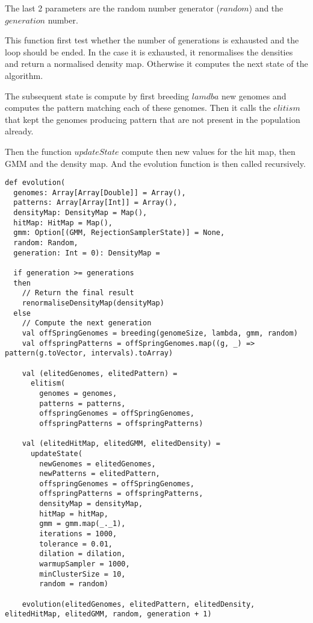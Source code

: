 \documentclass[10pt,a4paper]{article}
\theoremstyle{definition}
\theoremstyle{remark}
\begin{document}
The last 2 parameters are the random number generator ($random$) and the $generation$ number.

This function first test whether the number of generations is exhausted and the loop should be ended. In the case it is exhausted, it renormalises the densities and return a normalised density map. Otherwise it computes the next state of the algorithm.

The subsequent state is compute by first breeding $lamdba$ new genomes and computes the pattern matching each of these genomes. Then it calls the $elitism$ that kept the genomes producing pattern that are not present in the population already.

Then the function $updateState$ compute then new values for the hit map, then GMM and the density map. And the evolution function is then called recursively.

\begin{lstlisting}[caption={Evolution Loop},label={lst:loop}]
def evolution(
  genomes: Array[Array[Double]] = Array(),
  patterns: Array[Array[Int]] = Array(),
  densityMap: DensityMap = Map(),
  hitMap: HitMap = Map(),
  gmm: Option[(GMM, RejectionSamplerState)] = None,
  random: Random,
  generation: Int = 0): DensityMap =

  if generation >= generations
  then
    // Return the final result
    renormaliseDensityMap(densityMap)
  else
    // Compute the next generation
    val offSpringGenomes = breeding(genomeSize, lambda, gmm, random)
    val offspringPatterns = offSpringGenomes.map((g, _) => pattern(g.toVector, intervals).toArray)

    val (elitedGenomes, elitedPattern) =
      elitism(
        genomes = genomes,
        patterns = patterns,
        offspringGenomes = offSpringGenomes,
        offspringPatterns = offspringPatterns)

    val (elitedHitMap, elitedGMM, elitedDensity) =
      updateState(
        newGenomes = elitedGenomes,
        newPatterns = elitedPattern,
        offspringGenomes = offSpringGenomes,
        offspringPatterns = offspringPatterns,
        densityMap = densityMap,
        hitMap = hitMap,
        gmm = gmm.map(_._1),
        iterations = 1000,
        tolerance = 0.01,
        dilation = dilation,
        warmupSampler = 1000,
        minClusterSize = 10,
        random = random)

    evolution(elitedGenomes, elitedPattern, elitedDensity, elitedHitMap, elitedGMM, random, generation + 1)
\end{lstlisting}
\end{document}
